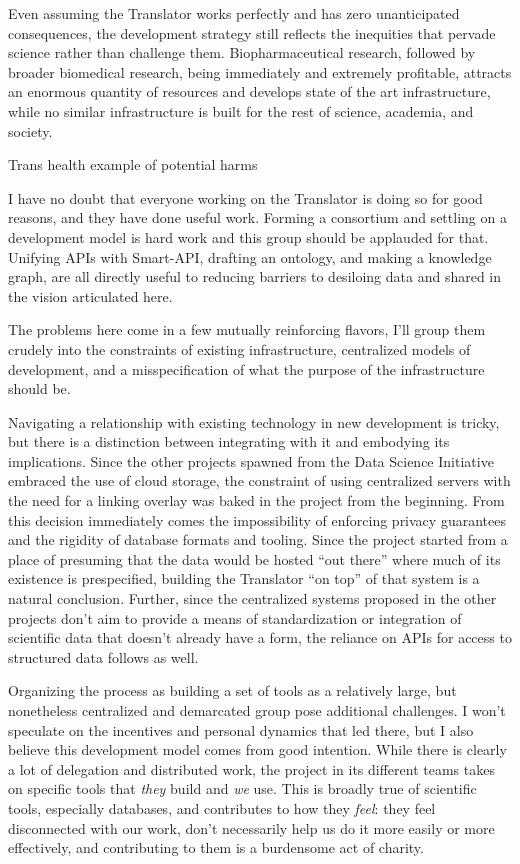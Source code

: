 \documentclass[10pt]{article}
\begin{document}
\begin{multicols}{2}
Even assuming the Translator works perfectly and has zero unanticipated
consequences, the development strategy still reflects the inequities
that pervade science rather than challenge them. Biopharmaceutical
research, followed by broader biomedical research, being immediately and
extremely profitable, attracts an enormous quantity of resources and
develops state of the art infrastructure, while no similar
infrastructure is built for the rest of science, academia, and society.

Trans health {example of potential harms}

I have no doubt that everyone working on the Translator is doing so for
good reasons, and they have done useful work. Forming a consortium and
settling on a development model is hard work and this group should be
applauded for that. Unifying APIs with Smart-API, drafting an ontology,
and making a knowledge graph, are all directly useful to reducing
barriers to desiloing data and shared in the vision articulated here.

The problems here come in a few mutually reinforcing flavors, I'll group
them crudely into the constraints of existing infrastructure,
centralized models of development, and a misspecification of what the
purpose of the infrastructure should be.

Navigating a relationship with existing technology in new development is
tricky, but there is a distinction between integrating with it and
embodying its implications. Since the other projects spawned from the
Data Science Initiative embraced the use of cloud storage, the
constraint of using centralized servers with the need for a linking
overlay was baked in the project from the beginning. From this decision
immediately comes the impossibility of enforcing privacy guarantees and
the rigidity of database formats and tooling. Since the project started
from a place of presuming that the data would be hosted ``out there''
where much of its existence is prespecified, building the Translator
``on top'' of that system is a natural conclusion. Further, since the
centralized systems proposed in the other projects don't aim to provide
a means of standardization or integration of scientific data that
doesn't already have a form, the reliance on APIs for access to
structured data follows as well.

Organizing the process as building a set of tools as a relatively large,
but nonetheless centralized and demarcated group pose additional
challenges. I won't speculate on the incentives and personal dynamics
that led there, but I also believe this development model comes from
good intention. While there is clearly a lot of delegation and
distributed work, the project in its different teams takes on specific
tools that \emph{they} build and \emph{we} use. This is broadly true of
scientific tools, especially databases, and contributes to how they
\emph{feel}: they feel disconnected with our work, don't necessarily
help us do it more easily or more effectively, and contributing to them
is a burdensome act of charity.


\end{multicols}
\end{document}
